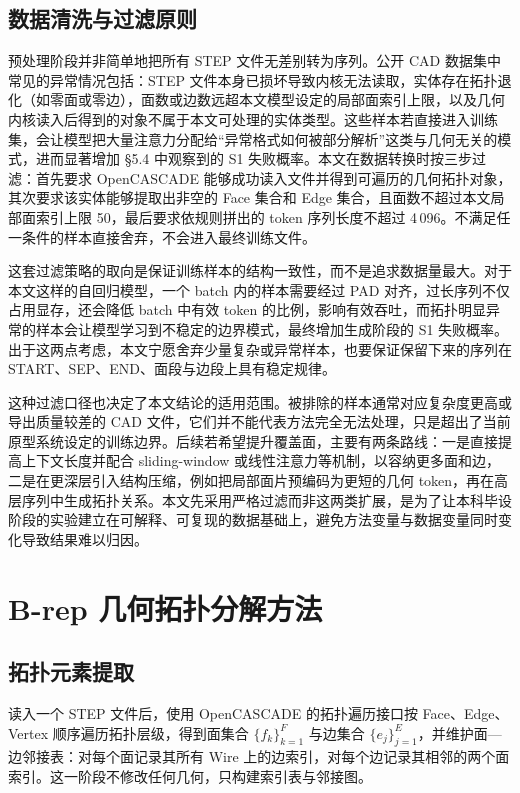 \subsection{数据清洗与过滤原则}

预处理阶段并非简单地把所有 STEP 文件无差别转为序列。公开 CAD 数据集中常见的异常情况包括：STEP 文件本身已损坏导致内核无法读取，实体存在拓扑退化（如零面或零边），面数或边数远超本文模型设定的局部面索引上限，以及几何内核读入后得到的对象不属于本文可处理的实体类型。这些样本若直接进入训练集，会让模型把大量注意力分配给“异常格式如何被部分解析”这类与几何无关的模式，进而显著增加 §5.4 中观察到的 S1 失败概率。本文在数据转换时按三步过滤：首先要求 OpenCASCADE 能够成功读入文件并得到可遍历的几何拓扑对象，其次要求该实体能够提取出非空的 Face 集合和 Edge 集合，且面数不超过本文局部面索引上限 50，最后要求依规则拼出的 token 序列长度不超过 4\,096。不满足任一条件的样本直接舍弃，不会进入最终训练文件。

这套过滤策略的取向是保证训练样本的结构一致性，而不是追求数据量最大。对于本文这样的自回归模型，一个 batch 内的样本需要经过 PAD 对齐，过长序列不仅占用显存，还会降低 batch 中有效 token 的比例，影响有效吞吐，而拓扑明显异常的样本会让模型学习到不稳定的边界模式，最终增加生成阶段的 S1 失败概率。出于这两点考虑，本文宁愿舍弃少量复杂或异常样本，也要保证保留下来的序列在 START、SEP、END、面段与边段上具有稳定规律。

这种过滤口径也决定了本文结论的适用范围。被排除的样本通常对应复杂度更高或导出质量较差的 CAD 文件，它们并不能代表方法完全无法处理，只是超出了当前原型系统设定的训练边界。后续若希望提升覆盖面，主要有两条路线：一是直接提高上下文长度并配合 sliding-window 或线性注意力等机制，以容纳更多面和边，二是在更深层引入结构压缩，例如把局部面片预编码为更短的几何 token，再在高层序列中生成拓扑关系。本文先采用严格过滤而非这两类扩展，是为了让本科毕设阶段的实验建立在可解释、可复现的数据基础上，避免方法变量与数据变量同时变化导致结果难以归因。

\section{B-rep 几何拓扑分解方法}

\subsection{拓扑元素提取}

读入一个 STEP 文件后，使用 OpenCASCADE 的拓扑遍历接口按 Face、Edge、Vertex 顺序遍历拓扑层级，得到面集合 $\{f_k\}_{k=1}^{F}$ 与边集合 $\{e_j\}_{j=1}^{E}$，并维护面—边邻接表：对每个面记录其所有 Wire 上的边索引，对每个边记录其相邻的两个面索引。这一阶段不修改任何几何，只构建索引表与邻接图。

